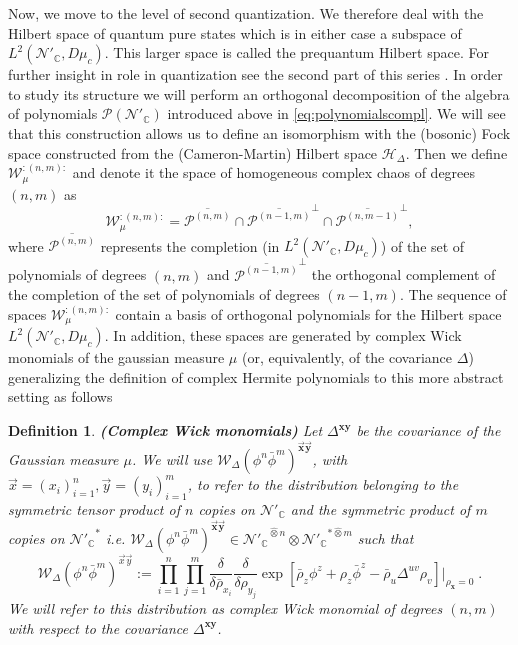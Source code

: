\documentclass[12pt]{article}%
\newtheorem{definition}{Definition}%
\begin{document}
Now, we move to the level of second quantization. We therefore deal with the Hilbert space of quantum pure states which is in either case a subspace of $L^2(\mathcal{N}'_\mathbb{C}, D\mu_c)$. This  larger space is called the prequantum Hilbert space. For further insight in role in quantization see the second part of this series \cite{alonso2023a}.  In order to study its structure we will perform an orthogonal decomposition of the algebra of polynomials $\mathcal{P}(\mathcal{N}'_{\mathbb{C}})$ introduced above in  \eqref{eq:polynomialscompl}. We will see that this construction allows us to define an isomorphism with the (bosonic) Fock space constructed from the  (Cameron-Martin) Hilbert space $\mathcal{H}_\Delta$. Then we define  $\mathcal{W}_\mu^{:(n,m):}$ and denote it the space of homogeneous complex chaos of degrees $(n,m)$ as
\begin{equation}
\label{eq:wickspaces}
\mathcal{W}_\mu^{:(n,m):}=\overline{\mathcal{P}^{(n,m)}}\cap \overline{\mathcal{P}^{{(n-1,m)}}}^\perp\cap \overline{\mathcal{P}^{{(n,m-1)}}}^\perp,
\end{equation}
where $\overline{\mathcal{P}^{(n,m)}}$ represents the completion (in $L^2(\mathcal{N}'_\mathbb{C}, D\mu_c)$) of the set of polynomials of degrees $(n,m)$  and $\overline{\mathcal{P}^{(n-1,m)}}^\perp$ the orthogonal complement of the completion of the set of polynomials of degrees $(n-1,m)$. The sequence of spaces  $\mathcal{W}_\mu^{:(n,m):}$  contain a basis of orthogonal polynomials for the Hilbert space $L^2(\mathcal{N}'_\mathbb{C}, D\mu_c)$. In addition, these spaces are   generated by complex Wick monomials of the gaussian measure $\mu$ (or, equivalently, of the covariance $\Delta$)  generalizing the definition of complex Hermite polynomials to this more abstract setting \cite{Hida1980} as follows


\begin{definition}
    \label{def:ComplexWickMonomials}{\bf (Complex Wick monomials)} 
    Let  $\Delta^{\mathbf{xy}}$ be the covariance of the Gaussian measure $\mu$.  
    We will use $\mathcal{W}_\Delta(\phi^n\bar{\phi}^m)^{\vec{\mathbf{x}}\vec{\mathbf{y}}}$, with $\vec{x}=(x_i)_{i=1}^n, \vec{y}=(y_i)_{i=1}^m$, to refer to the distribution belonging to the symmetric tensor product of $n$ copies on $\mathcal{N}'_\mathbb{C}$ and the symmetric product of $m$ copies on ${\mathcal{N}'_\mathbb{C}}^*$ i.e. $\mathcal{W}_\Delta(\phi^n\bar{\phi}^m)^{\vec{\mathbf{x}}\vec{\mathbf{y}}}\in{\mathcal{N}'_\mathbb{C}}^{\hat{\otimes}n}\otimes {\mathcal{N}'_\mathbb{C}}^{*\hat{\otimes}m}$ such that
    \begin{equation}
    \label{eq:ComplexWienerIto}
    \mathcal{W}_\Delta(\phi^n\bar{\phi}^m)^{\vec{x}\vec{y}}:=\prod_{i=1}^n\prod_{j=1}^m\frac{\delta}{\delta \bar\rho_{x_i}}\frac{\delta}{\delta \rho_{y_j}}\exp\left[{\bar\rho_z\phi^z+\rho_z\bar\phi^z-\bar\rho_u\Delta^{uv}\rho_v}\right]\bigg\lvert_{\rho_{\mathbf{x}}=0}\;.
    \end{equation}
    We will refer to this distribution as \textit{complex Wick monomial} of degrees $(n,m)$ with respect to the covariance $\Delta^{\mathbf{xy}}$.
\end{definition}
\end{document}
